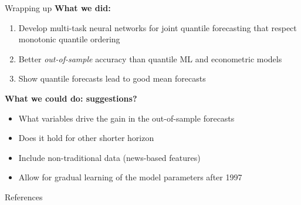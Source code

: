 \documentclass[aspectratio=169]{beamer}
\begin{document}
\begin{frame}{Wrapping up}
    \textbf{What we did:}
	\begin{enumerate}
		\item {Develop multi-task neural networks for joint quantile forecasting that respect monotonic quantile ordering}
        \vspace{.1cm}
		\item {Better \textit{out-of-sample} accuracy than quantile ML and econometric models}
        \vspace{.1cm}
		\item {Show quantile forecasts lead to good mean forecasts} %
        \vspace{.6cm}
	\end{enumerate} 

    \textbf{What we could do: suggestions?}
    \begin{itemize}
        \vspace{.1cm}
        \item What variables drive the gain in the out-of-sample forecasts
        \vspace{.1cm}
        \item Does it hold for other shorter horizon
        \vspace{.1cm}
        \item Include non-traditional data (news-based features)
        \vspace{.1cm}
        \item Allow for gradual learning of the model parameters after 1997
    \end{itemize}
\end{frame}

\begin{frame}[allowframebreaks]{References}
    \printbibliography
\end{frame}

\appendix
\end{document}
